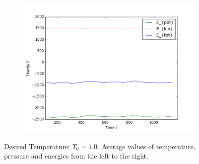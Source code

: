 \begin{figure}[ht]
\begin{subfigure}{0.3\textwidth}
\end{subfigure}
\hfill
\begin{subfigure}{0.3\textwidth}
\includegraphics[width=\textwidth]{fig/avEnergies_T1d0_F20d0_M100.png}
\end{subfigure}
\caption{
Desired Temperature: $T_0=1.0$.
Average values of temperature, pressure and energies from the left to the right.}
\label{9T1d0}
\end{figure}

